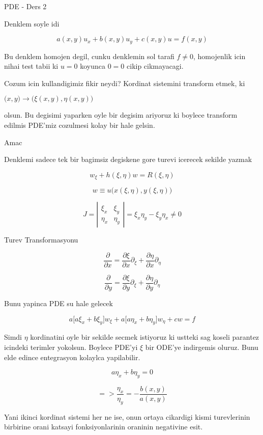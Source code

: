\documentclass[12pt,fleqn]{article}
\begin{document}
PDE - Ders 2

Denklem soyle idi

\[ a(x,y)u_x + b(x,y)u_y + c(x,y)u = f(x,y) \]

Bu denklem homojen degil, cunku denklemin sol tarafi $f \ne 0$, homojenlik
icin nihai test tabii ki $u=0$ koyunca $0=0$ cikip cikmayacagi.

Cozum icin kullandigimiz fikir neydi? Kordinat sistemini transform etmek,
ki 

$\bigg(x,y\bigg) \to \bigg(\xi(x,y), \eta(x,y)\bigg)$

olsun. Bu degisimi yaparken oyle bir degisim ariyoruz ki boylece transform
edilmis PDE'miz cozulmesi kolay bir hale gelsin. 

Amac

Denklemi sadece tek bir bagimsiz degiskene gore turevi icerecek sekilde
yazmak 

\[ w_\xi + h(\xi,\eta)w  = R(\xi,\eta) \]

\[ w \equiv u \bigg( x(\xi,\eta),y(\xi,\eta) \bigg)  \]

\[ 
J = 
\left|\begin{array}{rr}
\xi_x & \xi_y \\
\eta_x & \eta_y
\end{array}\right| =
\xi_x \eta_y - \xi_y \eta_x \ne 0
 \]

Turev Transformasyonu

\[ \frac{\partial }{\partial x} = 
\frac{\partial \xi}{\partial x}  \partial_\xi + 
\frac{\partial \eta}{\partial x}\partial_\eta
\]

\[ \frac{\partial }{\partial y} = 
\frac{\partial \xi}{\partial y}  \partial_\xi + 
\frac{\partial \eta}{\partial y}\partial_\eta
\]

Bunu yapinca PDE su hale gelecek

\[ a \bigg[ a\xi_x + b\xi_y \bigg]w_\xi + 
a \bigg[ a\eta_x + b\eta_y \bigg]w_\eta + 
cw = f
 \]

Simdi $\eta$ kordinatini oyle bir sekilde secmek istiyoruz ki ustteki sag
koseli parantez icindeki terimler yokolsun. Boylece PDE'yi $\xi$ bir ODE'ye
indirgemis oluruz. Bunu elde edince entegrasyon kolaylca yapilabilir. 

\[ a \eta_x + b\eta_y = 0 \]

\[=> \frac{\eta_x}{\eta_y} = - \frac{b(x,y)}{a(x,y)} \]


Yani ikinci kordinat sistemi her ne ise, onun ortaya cikardigi kismi
turevlerinin birbirine orani katsayi fonksiyonlarinin oraninin negativine
esit.  
\end{document}
